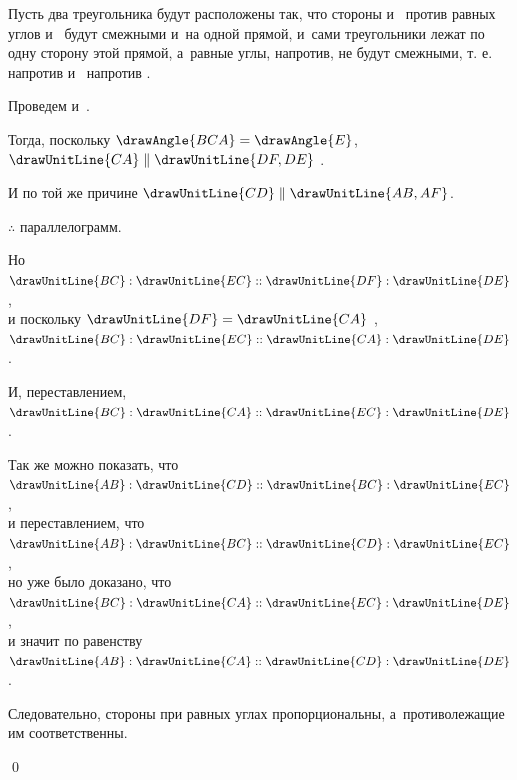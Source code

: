 \documentclass[letters,booklanguage=russian]{byrnebook}
\begin{document}
Пусть два треугольника будут расположены так, что стороны  и~ против равных углов  и~  будут смежными и~на одной прямой, и~сами треугольники лежат по одну сторону этой прямой, а~равные углы, напротив, не будут смежными, т. е.  напротив  и~ напротив .

\begin{center}
Проведем  и~.

Тогда, поскольку $\drawAngle{BCA} = \drawAngle{E}$, $\drawUnitLine{CA} \parallel \drawUnitLine{DF,DE}$ .

И по той же причине $\drawUnitLine{CD} \parallel \drawUnitLine{AB,AF}$.

$\therefore$
параллелограмм.

Но $\drawUnitLine{BC} : \drawUnitLine{EC} :: \drawUnitLine{DF} : \drawUnitLine{DE}$ ,\\
и поскольку $\drawUnitLine{DF} = \drawUnitLine{CA}$ ,\\
$\drawUnitLine{BC} : \drawUnitLine{EC} :: \drawUnitLine{CA} : \drawUnitLine{DE}$.

И, переставлением, $\drawUnitLine{BC} : \drawUnitLine{CA} :: \drawUnitLine{EC} : \drawUnitLine{DE}$ .

Так же можно показать, что\\
$\drawUnitLine{AB} : \drawUnitLine{CD} :: \drawUnitLine{BC} : \drawUnitLine{EC}$,\\
и переставлением, что\\
$\drawUnitLine{AB} : \drawUnitLine{BC} :: \drawUnitLine{CD} : \drawUnitLine{EC}$,\\
но уже было доказано, что\\
$\drawUnitLine{BC} : \drawUnitLine{CA} :: \drawUnitLine{EC} : \drawUnitLine{DE}$,\\
и значит по равенству\\
$\drawUnitLine{AB} : \drawUnitLine{CA} :: \drawUnitLine{CD} : \drawUnitLine{DE}$ .
\end{center}

Следовательно, стороны при равных углах пропорциональны, а~противолежащие им соответственны.

\qed
\end{document}
